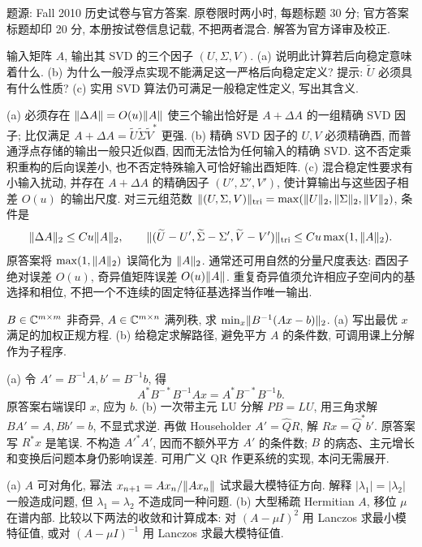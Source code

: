 题源: Fall 2010 历史试卷与官方答案. 原卷限时两小时, 每题标题 30 分; 官方答案标题却印 20 分, 本册按试卷信息记载, 不把两者混合. 解答为官方译审及校正.
\begin{exercise}\label{e2010:q1}
输入矩阵 $A$, 输出其 SVD 的三个因子 $(U,\Sigma,V)$.
(a) 说明此计算若后向稳定意味着什么.
(b) 为什么一般浮点实现不能满足这一严格后向稳定定义? 提示: $\widetilde U$ 必须具有什么性质?
(c) 实用 SVD 算法仍可满足一般稳定性定义, 写出其含义.
\end{exercise}
\begin{solution}
(a) 必须存在 $\lVert \Delta A\rVert=O(u)\lVert A\rVert$ 使三个输出恰好是 $A+\Delta A$ 的一组精确 SVD 因子; 比仅满足 $A+\Delta A=\widetilde U\widetilde\Sigma\widetilde V^*$ 更强.
(b) 精确 SVD 因子的 $U,V$ 必须精确酉, 而普通浮点存储的输出一般只近似酉, 因而无法恰为任何输入的精确 SVD. 这不否定乘积重构的后向误差小, 也不否定特殊输入可恰好输出酉矩阵.
(c) 混合稳定性要求有小输入扰动, 并存在 $A+\Delta A$ 的精确因子 $(U',\Sigma',V')$, 使计算输出与这些因子相差 $O(u)$ 的输出尺度. 对三元组范数 $\lVert (U,\Sigma,V)\rVert_{\rm tri}=\max(\lVert U\rVert_2,\lVert \Sigma\rVert_2,\lVert V\rVert_2)$, 条件是
\[
 \lVert \Delta A\rVert_2\le Cu\lVert A\rVert_2,\qquad
 \lVert (\widetilde U-U',\widetilde\Sigma-\Sigma',\widetilde V-V')\rVert_{\rm tri}
 \le Cu\max(1,\lVert A\rVert_2).
\]
原答案将 $\max(1,\lVert A\rVert_2)$ 误简化为 $\lVert A\rVert_2$. 通常还可用自然的分量尺度表达: 酉因子绝对误差 $O(u)$, 奇异值矩阵误差 $O(u)\lVert A\rVert$. 重复奇异值须允许相应子空间内的基选择和相位, 不把一个不连续的固定特征基选择当作唯一输出.
\end{solution}
\begin{exercise}\label{e2010:q2}
$B\in\mathbb C^{m\times m}$ 非奇异, $A\in\mathbb C^{m\times n}$ 满列秩, 求 $\min_x\lVert B^{-1}(Ax-b)\rVert_2$.
(a) 写出最优 $x$ 满足的加权正规方程.
(b) 给稳定求解路径, 避免平方 $A$ 的条件数, 可调用课上分解作为子程序.
\end{exercise}
\begin{solution}
(a) 令 $A'=B^{-1}A,b'=B^{-1}b$, 得
\[
 A^*B^{-*}B^{-1}Ax=A^*B^{-*}B^{-1}b.
\]
原答案右端误印 $x$, 应为 $b$.
(b) 一次带主元 LU 分解 $PB=LU$, 用三角求解 $BA'=A,Bb'=b$, 不显式求逆. 再做 Householder $A'=\widehat QR$, 解 $Rx=\widehat Q^*b'$. 原答案写 $R^*x$ 是笔误. 不构造 $A'^*A'$, 因而不额外平方 $A'$ 的条件数; $B$ 的病态、主元增长和变换后问题本身仍影响误差. 可用广义 QR 作更系统的实现, 本问无需展开.
\end{solution}
\begin{exercise}\label{e2010:q3}
(a) $A$ 可对角化, 幂法 $x_{n+1}=Ax_n/\lVert Ax_n\rVert$ 试求最大模特征方向. 解释 $|\lambda_1|=|\lambda_2|$ 一般造成问题, 但 $\lambda_1=\lambda_2$ 不造成同一种问题.
(b) 大型稀疏 Hermitian $A$, 移位 $\mu$ 在谱内部. 比较以下两法的收敛和计算成本: 对 $(A-\mu I)^2$ 用 Lanczos 求最小模特征值, 或对 $(A-\mu I)^{-1}$ 用 Lanczos 求最大模特征值.
\end{exercise}
